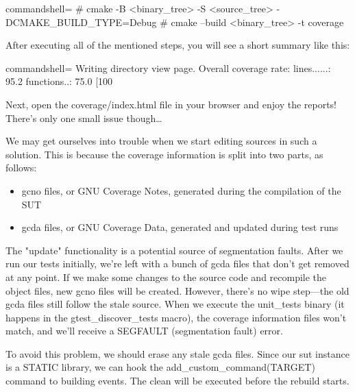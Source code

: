 \begin{tcblisting}{commandshell={}}
# cmake -B <binary_tree> -S <source_tree>
    -DCMAKE_BUILD_TYPE=Debug
# cmake --build <binary_tree> -t coverage
\end{tcblisting}

After executing all of the mentioned steps, you will see a short summary like this:

\begin{tcblisting}{commandshell={}}
Writing directory view page.
Overall coverage rate:
  lines......: 95.2%
  functions..: 75.0%
[100%
\end{tcblisting}

Next, open the coverage/index.html file in your browser and enjoy the reports! There's only one small issue though…




We may get ourselves into trouble when we start editing sources in such a solution. This is because the coverage information is split into two parts, as follows:

\begin{itemize}
\item 
gcno files, or GNU Coverage Notes, generated during the compilation of the SUT

\item 
gcda files, or GNU Coverage Data, generated and updated during test runs
\end{itemize}

The "update" functionality is a potential source of segmentation faults. After we run our tests initially, we're left with a bunch of gcda files that don't get removed at any point. If we make some changes to the source code and recompile the object files, new gcno files will be created. However, there's no wipe step—the old gcda files still follow the stale source. When we execute the unit\_tests binary (it happens in the gtest\_discover\_tests macro), the coverage information files won't match, and we'll receive a SEGFAULT (segmentation fault) error.

To avoid this problem, we should erase any stale gcda files. Since our sut instance is a STATIC library, we can hook the add\_custom\_command(TARGET) command to building events. The clean will be executed before the rebuild starts.

